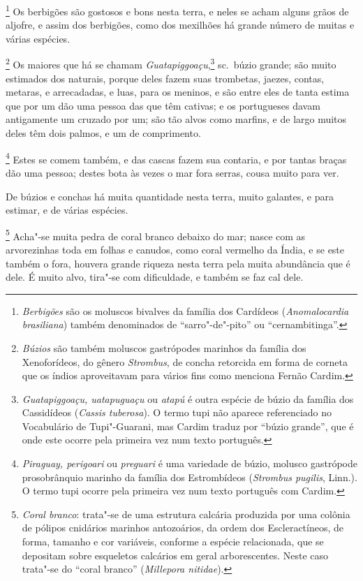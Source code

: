 \footnote{ \textit{Berbigões} são os moluscos
bivalves da família dos Cardídeos (\textit{Anomalocardia brasiliana}) 
também denominados de ``sarro"-de"-pito'' ou ``cernambitinga''.} 
Os berbigões são gostosos e bons nesta terra, e neles se acham alguns
grãos de aljofre, e assim dos berbigões, como dos mexilhões há grande
número de muitas e várias espécies.

\footnote{ \textit{Búzios} são também moluscos
gastrópodes marinhos da família dos Xenoforídeos, do gênero
\textit{Strombus}, de concha retorcida em forma de corneta que os
índios aproveitavam para vários fins como menciona Fernão Cardim.} 
Os maiores que há se chamam \textit{Guatapiggoaçu},\footnote{ \textit{Guatapiggoaçu, uatapuguaçu} ou \textit{atapú} é
outra espécie de búzio da família dos Cassidídeos (\textit{Cassis
tuberosa}). O termo tupi não aparece referenciado no Vocabulário de
Tupi"-Guarani, mas Cardim traduz por ``búzio grande'', que é onde este
ocorre pela primeira vez num texto português.} sc.~búzio grande; são
muito estimados dos naturais, porque deles fazem suas trombetas,
jaezes, contas, metaras, e arrecadadas, e luas, para os meninos, e são
entre eles de tanta estima que por um dão uma pessoa das que têm
cativas; e os portugueses davam antigamente um cruzado por um; são tão
alvos como marfins, e de largo muitos deles têm dois palmos, e um de comprimento.

\footnote{ \textit{Piraguay, perigoari} ou
\textit{preguari} é uma variedade de búzio, molusco gastrópode
prosobrânquio marinho da família dos Estrombídeos (\textit{Strombus
pugilis}, Linn.). O termo tupi ocorre pela primeira vez num texto
português com Cardim.} Estes se comem também, e das cascas
fazem sua contaria, e por tantas braças dão uma pessoa; destes bota às
vezes o mar fora serras, cousa muito para ver. 

 De búzios e conchas há muita quantidade nesta terra, muito galantes, e
para estimar, e de várias espécies.

\footnote{ \textit{Coral branco}: trata"-se de
uma estrutura calcária produzida por uma colônia de pólipos cnidários
marinhos antozoários, da ordem dos Escleractíneos, de forma, tamanho e
cor variáveis, conforme a espécie relacionada, que se depositam sobre
esqueletos calcários em geral arborescentes. Neste caso trata"-se do
``coral branco'' (\textit{Millepora nitidae}).} Acha"-se muita
pedra de coral branco debaixo do mar; nasce com as arvorezinhas toda em
folhas e canudos, como coral vermelho da Índia, e se este também o
fora, houvera grande riqueza nesta terra pela muita abundância que é
dele. É muito alvo, tira"-se com dificuldade, e também se faz cal dele.

